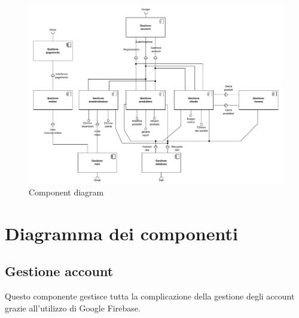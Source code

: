 
\begin{landscape}

\begin{figure}[!ht]
    \centering
    \includegraphics[trim= 0cm 0.2cm 0.4cm 0.3cm, clip, width=0.95\linewidth]{Deliverables/second-deliverable/img/Component-Diagram.drawio.pdf}
    \caption{Component diagram}
\end{figure}

\end{landscape}

\restoregeometry

\section{Diagramma dei componenti}

\subsection{Gestione account}
Questo componente gestisce tutta la complicazione della gestione degli account grazie all'utilizzo di Google Firebase.


